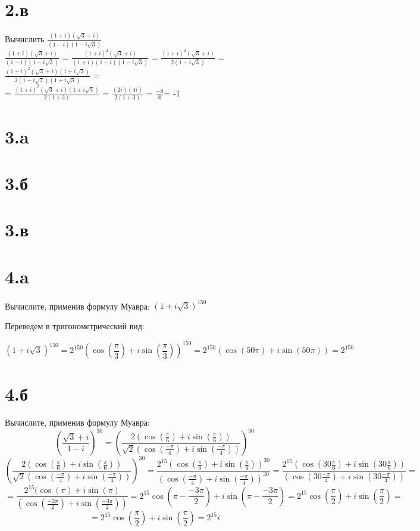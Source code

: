 \documentclass[a4paper]{article}
\begin{document}
\section*{2.в}
Вычислить  $\frac{(1 +i)(\sqrt{3} + i)}{(1 - i)(1 - i\sqrt{3})}$\\
$\frac{(1 +i)(\sqrt{3} + i)}{(1 - i)(1 - i\sqrt{3})}$ = $\frac{(1 +i)^2(\sqrt{3} + i)}{(1 +i)(1 - i)(1 - i\sqrt{3})}$ = $\frac{(1 +i)^2(\sqrt{3} + i)}{2(1 - i\sqrt{3})}$ =
 $\frac{(1 +i)^2(\sqrt{3} + i)(1 + i  \sqrt{3})}{2(1 - i\sqrt{3})(1 + i \sqrt{3})}$  =\\
 =  $\frac{(1 +i)^2(\sqrt{3} + i)(1 + i  \sqrt{3})}{2(1 + 3)}$  =   $\frac{(2i)(4i)}{2(1 + 3)}$  = $\frac{-8}{8} $= -1






\section*{3.a}

\section*{3.б}

\section*{3.в}
\section*{4.a}
Вычислите, применив формулу Муавра: $(1 + i \sqrt{3})^{150}$

Переведем в тригонометрический вид:

$$(1 + i \sqrt{3})^{150} = 2^{150}(\cos(\frac{\pi}{3}) + i\sin(\frac{\pi}{3}))^{150} = 2^{150}(\cos(50\pi) + i\sin(50\pi)) = 2^{150}$$


\section*{4.б}

Вычислите, применив формулу Муавра:
$$(\frac{\sqrt{3} + i}{1 -i})^{30}=
(\frac{2(\cos(\frac{\pi}{6}) + i\sin(\frac{\pi}{6}))}{\sqrt{2}(\cos(\frac{-\pi}{4}) + i\sin(\frac{-\pi}{4}))})^{30} 
$$
$$
(\frac{2(\cos(\frac{\pi}{6}) + i\sin(\frac{\pi}{6}))}{\sqrt{2}(\cos(\frac{-\pi}{4}) + i\sin(\frac{-\pi}{4}))})^{30}  = \frac{2^{15}(\cos(\frac{\pi}{6}) + i\sin(\frac{\pi}{6}))^{30}}{(\cos(\frac{-\pi}{4}) + i\sin(\frac{-\pi}{4}))^{30}}=
\frac{2^{15}(\cos(30\frac{\pi}{6}) + i\sin(30\frac{\pi}{6}))}{(\cos(30\frac{-\pi}{4}) + i\sin(30\frac{-\pi}{4}))}
=$$
$$ 
=
\frac{2^{15}(\cos(\pi) + i\sin(\pi)}{(\cos(\frac{-3\pi}{2}) + i\sin(\frac{-3\pi}{2}))}=
2^{15}\cos(\pi - \frac{-3\pi}{2}) + i\sin(\pi - \frac{-3\pi}{2})=
2^{15}\cos(\frac{\pi}{2}) + i\sin(\frac{\pi}{2})=
$$
$$
= 2^{15}\cos(\frac{\pi}{2}) + i\sin(\frac{\pi}{2}) = 2^{15}i
$$
\end{document}
